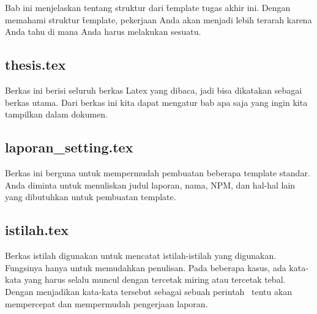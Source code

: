 \chapter{\babEmpat}
\label{bab:4}
Bab ini menjelaskan tentang struktur dari \f{template} tugas akhir ini.
Dengan memahami struktur \f{template}, pekerjaan Anda akan menjadi lebih terarah karena Anda tahu di mana Anda harus melakukan sesuatu.



\section{thesis.tex}
\label{sec:thesis-tex}
Berkas ini berisi seluruh berkas Latex yang dibaca, jadi bisa dikatakan sebagai berkas utama.
Dari berkas ini kita dapat mengatur bab apa saja yang ingin kita tampilkan dalam dokumen.


\section{laporan\_setting.tex}
\label{sec:laporan-setting-tex}
Berkas ini berguna untuk mempermudah pembuatan beberapa template standar. 
Anda diminta untuk menuliskan judul laporan, nama, NPM, dan hal-hal lain yang dibutuhkan untuk pembuatan template. 


\section{istilah.tex}
\label{sec:istilah-tex}
Berkas istilah digunakan untuk mencatat istilah-istilah yang digunakan. 
Fungsinya hanya untuk memudahkan penulisan.
Pada beberapa kasus, ada kata-kata yang harus selalu muncul dengan tercetak miring atau tercetak tebal. 
Dengan menjadikan kata-kata tersebut sebagai sebuah perintah \latex~tentu akan mempercepat dan mempermudah pengerjaan laporan. 


